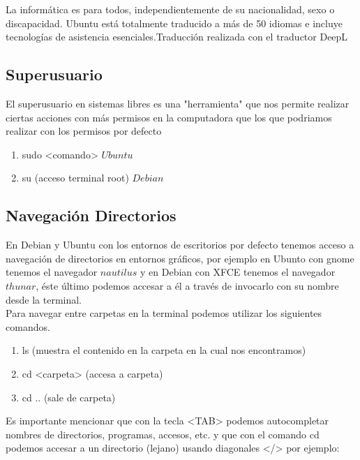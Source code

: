 \documentclass[]{article}
\begin{document}
La informática es para todos, independientemente de su nacionalidad, sexo o discapacidad. Ubuntu está totalmente traducido a más de 50 idiomas e incluye tecnologías de asistencia esenciales.\cite{UbuntuIntro}Traducción realizada con el traductor DeepL \cite{DeepL}\\

\subsection{Superusuario}

El superusuario en sistemas libres es una "herramienta" que nos permite realizar ciertas acciones con más permisos en la computadora que los que podriamos realizar con los permisos por defecto\\

\begin{enumerate}
	\item sudo <comando> $Ubuntu$
	
	\item su (acceso terminal root) $Debian$
\end{enumerate}

\subsection{Navegación Directorios}

En Debian y Ubuntu con los entornos de escritorios por defecto tenemos acceso a navegación de directorios en entornos gráficos, por ejemplo en Ubunto con gnome tenemos el navegador $nautilus$ y en Debian con XFCE tenemos el navegador $thunar$, éste último podemos accesar a él a través de invocarlo con su nombre desde la terminal.\\

Para navegar entre carpetas en la terminal podemos utilizar los siguientes comandos.\\

\begin{enumerate}
	\item ls (muestra el contenido en la carpeta en la cual nos encontramos)
	\item cd <carpeta> (accesa a carpeta)
	\item cd .. (sale de carpeta)
\end{enumerate}

Es importante mencionar que con la tecla <TAB> podemos autocompletar nombres de directorios, programas, accesos, etc. y que con el comando cd podemos accesar a un directorio (lejano) usando diagonales </> por ejemplo:
\end{document}
